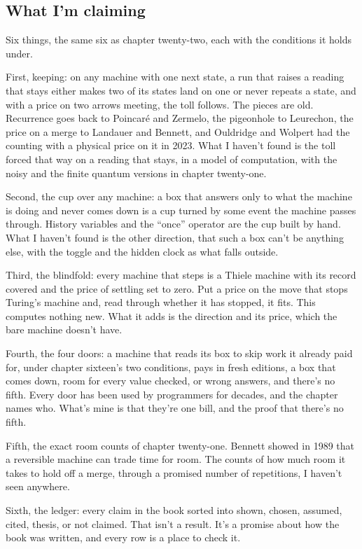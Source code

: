 \documentclass[11pt,twoside]{article}
\theoremstyle{thielethm}
\theoremstyle{thieledef}
\theoremstyle{thieledef}
\theoremstyle{thieledef}
\theoremstyle{thielethm}
\theoremstyle{thieleobs}
\theoremstyle{thielethm}
\begin{document}
\subsection{What I'm claiming}

Six things, the same six as chapter twenty-two, each with the conditions it holds under.

First, keeping: on any machine with one next state, a run that raises a reading that stays either makes two of its states land on one or never repeats a state, and with a price on two arrows meeting, the toll follows. The pieces are old. Recurrence goes back to Poincaré and Zermelo, the pigeonhole to Leurechon, the price on a merge to Landauer and Bennett, and Ouldridge and Wolpert had the counting with a physical price on it in 2023. What I haven't found is the toll forced that way on a reading that stays, in a model of computation, with the noisy and the finite quantum versions in chapter twenty-one.

Second, the cup over any machine: a box that answers only to what the machine is doing and never comes down is a cup turned by some event the machine passes through. History variables and the ``once'' operator are the cup built by hand. What I haven't found is the other direction, that such a box can't be anything else, with the toggle and the hidden clock as what falls outside.

Third, the blindfold: every machine that steps is a Thiele machine with its record covered and the price of settling set to zero. Put a price on the move that stops Turing's machine and, read through whether it has stopped, it fits. This computes nothing new. What it adds is the direction and its price, which the bare machine doesn't have.

Fourth, the four doors: a machine that reads its box to skip work it already paid for, under chapter sixteen's two conditions, pays in fresh editions, a box that comes down, room for every value checked, or wrong answers, and there's no fifth. Every door has been used by programmers for decades, and the chapter names who. What's mine is that they're one bill, and the proof that there's no fifth.

Fifth, the exact room counts of chapter twenty-one. Bennett showed in 1989 that a reversible machine can trade time for room. The counts of how much room it takes to hold off a merge, through a promised number of repetitions, I haven't seen anywhere.

Sixth, the ledger: every claim in the book sorted into shown, chosen, assumed, cited, thesis, or not claimed. That isn't a result. It's a promise about how the book was written, and every row is a place to check it.
\end{document}
